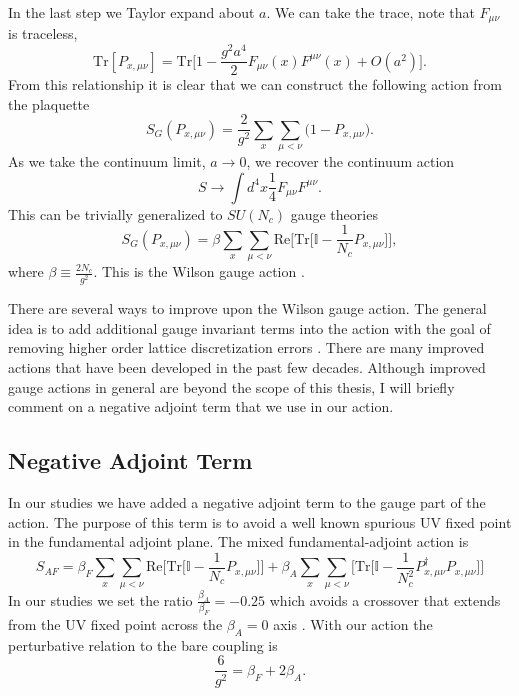 In the last step we Taylor expand about $a$.
We can take the trace, note that $F_{\mu\nu}$ is traceless,
\begin{equation}
  \mbox{Tr}[P_{x,\mu\nu}]=\mbox{Tr}\Big[1-\frac{g^2a^4}{2}F_{\mu\nu}(x)F^{\mu\nu}(x) + O(a^2)\Big].
\end{equation}
From this relationship it is clear that we can construct the following action from the plaquette
\begin{equation}
  S_G(P_{x,\mu\nu})=\frac{2}{g^2}\sum_{x} \sum_{\mu<\nu} \big(1-P_{x,\mu\nu}\big).
\end{equation}
As we take the continuum limit, $a\rightarrow 0$, we recover the continuum action
\begin{equation}
  S\rightarrow \int d^4x\frac{1}{4}F_{\mu\nu}F^{\mu\nu}.
\end{equation}
This can be trivially generalized to $SU(N_c)$ gauge theories
\begin{equation}
  S_G(P_{x,\mu\nu})=\beta\sum_{x} \sum_{\mu<\nu} \mbox{Re}\Big[\mbox{Tr}\big[\mathbb{I}-\frac{1}{N_c}P_{x,\mu\nu}\big]\Big],
\end{equation}
where $\beta\equiv\frac{2N_c}{g^2}$.
This is the Wilson gauge action \cite{PhysRevD.10.2445}.

There are several ways to improve upon the Wilson gauge action.
The general idea is to add additional gauge invariant terms into the action with the goal of removing higher order lattice discretization errors \cite{Symanzik1983205, Weisz19831, Lüscher1985250}.
There are many improved actions that have been developed in the past few decades.
Although improved gauge actions in general are beyond the scope of this thesis, I will briefly comment on a negative adjoint term that we use in our action.

\subsection{Negative Adjoint Term}

In our studies we have added a negative adjoint term to the gauge part of the action.
The purpose of this term is to avoid a well known spurious UV fixed point \cite{PhysRevD.24.3212,Bhanot1982337,Blum1995301} in the fundamental adjoint plane.
The mixed fundamental-adjoint action is
\begin{equation}
  S_{AF}=\beta_F\sum_{x} \sum_{\mu<\nu} \mbox{Re}\Big[\mbox{Tr}\big[\mathbb{I}-\frac{1}{N_c}P_{x,\mu\nu}\big]\Big] + \beta_A\sum_{x} \sum_{\mu<\nu}\Big[\mbox{Tr}\big[\mathbb{I}-\frac{1}{N_c^2}P_{x,\mu\nu}^\dagger P_{x,\mu\nu}\big]\Big]
\end{equation}
In our studies we set the ratio $\frac{\beta_A}{\beta_F}=-0.25$ which avoids a crossover that extends from the UV fixed point across the $\beta_A=0$ axis \cite{Hasenfratz:2010fi}.
With our action the perturbative relation to the bare coupling is
\begin{equation}
  \frac{6}{g^2}=\beta_F+2\beta_A.
\end{equation}
